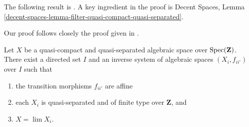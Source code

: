 \noindent
The following result is \cite[Theorem 1.2.2]{CLO}.
A key ingredient in the proof is
Decent Spaces, Lemma
\ref{decent-spaces-lemma-filter-quasi-compact-quasi-separated}.

\begin{proposition}
\label{proposition-approximate}
\begin{reference}
Our proof follows closely the proof given in \cite[Theorem 1.2.2]{CLO}.
\end{reference}
Let $X$ be a quasi-compact and quasi-separated algebraic space over
$\mathop{\mathrm{Spec}}(\mathbf{Z})$. There exist a directed set $I$
and an inverse system of algebraic spaces $(X_i, f_{ii'})$ over $I$
such that
\begin{enumerate}
\item the transition morphisms $f_{ii'}$ are affine
\item each $X_i$ is quasi-separated and of finite type over
$\mathbf{Z}$, and
\item $X = \lim X_i$.
\end{enumerate}
\end{proposition}


